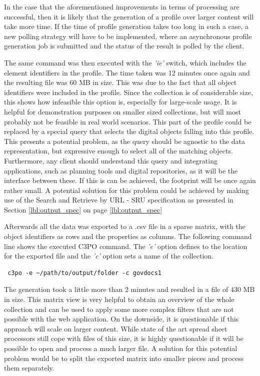 In the case that the aforementioned improvements in terms of processing are successful, then it is likely that the generation of a profile over larger content will take more time.
If the time of profile generation takes too long in such a case, a new polling strategy will have to be implemented, where an asynchronous profile generation job is submitted and the status of the result is polled by the client.

The same command was then executed with the \textit{'ie'} switch, which includes the element identifiers in the profile.
The time taken was 12 minutes once again and the resulting file was 60 MB in size.
This was due to the fact that all object identifiers were included in the profile.
Since the collection is of considerable size, this shows how infeasible this option is, especially for large-scale usage.
It is helpful for demonstration purposes on smaller sized collections, but will most probably not be feasible in real world scenarios.
This part of the profile could be replaced by a special query that selects the digital objects falling into this profile.
This presents a potential problem, as the query should be agnostic to the data representation, but expressive enough to select all of the matching objects.
Furthermore, any client should understand this query and integrating applications, such as planning tools and digital repositories, as it will be the interface between these.
If this is can be achieved, the footprint will be once again rather small. A potential solution for this problem could be achieved by making use of the Search and Retrieve by URL - SRU specification as presented in Section \ref{lbl:output_spec} on page \ref{lbl:output_spec}

Afterwards all the data was exported to a .csv file in a sparse matrix, with the object identifiers as rows and the properties as columns.
The following command line shows the executed C3PO command. The \textit{'e'} option defines to the location for the exported file and the \textit{'c'} option sets a name of the collection.

\begin{verbatim}
 c3po -e ~/path/to/output/folder -c govdocs1
\end{verbatim}

The generation took a little more than 2 minutes and resulted in a file of 430 MB in size.
This matrix view is very helpful to obtain an overview of the whole collection and can be used to apply some more complex filters that are not possible with the web application.
On the downside, it is questionable if this approach will scale on larger content.
While state of the art spread sheet processors still cope with files of this size, it is highly questionable if it will be possible to open and process a much larger file.
A solution for this potential problem would be to split the exported matrix into smaller pieces and process them separately.

